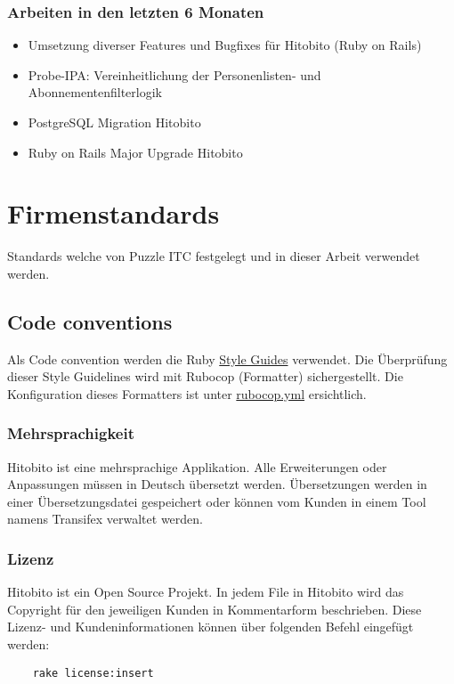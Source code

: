 \subsection{Arbeiten in den letzten 6 Monaten}
\begin{itemize}
    \item Umsetzung diverser Features und Bugfixes für Hitobito (Ruby on Rails)
    \item Probe-IPA: Vereinheitlichung der Personenlisten- und Abonnementenfilterlogik
    \item PostgreSQL Migration Hitobito
    \item Ruby on Rails Major Upgrade Hitobito
\end{itemize}

\chapter{Firmenstandards}
Standards welche von Puzzle ITC festgelegt und in dieser Arbeit verwendet werden.

\section{Code conventions}
Als Code convention werden die Ruby \href{https://github.com/rubocop/ruby-style-guide}{Style Guides} verwendet. 
Die Überprüfung dieser Style Guidelines wird mit Rubocop (Formatter) sichergestellt. Die Konfiguration
dieses Formatters ist unter \href{https://github.com/hitobito/hitobito/blob/master/.rubocop.yml}{rubocop.yml} ersichtlich.

\subsection{Mehrsprachigkeit}
Hitobito ist eine mehrsprachige Applikation. Alle Erweiterungen oder Anpassungen müssen
in Deutsch übersetzt werden. Übersetzungen werden in einer Übersetzungsdatei gespeichert oder können
vom Kunden in einem Tool namens Transifex verwaltet werden.

\subsection{Lizenz}
Hitobito ist ein Open Source Projekt.
In jedem File in Hitobito wird das Copyright für den jeweiligen Kunden in Kommentarform beschrieben. 
Diese Lizenz- und Kundeninformationen können über folgenden Befehl 
eingefügt werden:

\begin{verbatim}
    rake license:insert
\end{verbatim}

